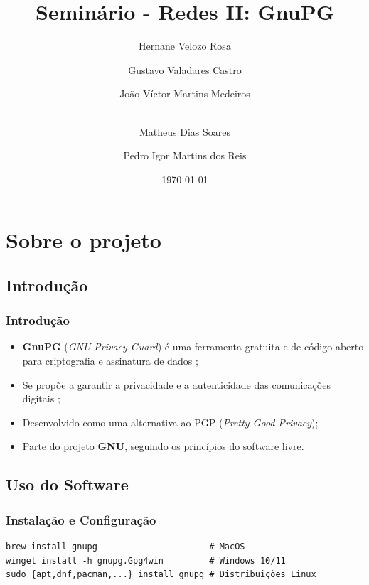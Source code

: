 \documentclass[aspectratio=169]{beamer}
\date{\today}
\title[GNU Privacy Guard]{Seminário - Redes II: GnuPG}
\author[Hernane\and Gustavo\and João\and Matheus\and Pedro]{
    Hernane Velozo Rosa \and
    Gustavo Valadares Castro \and
    João Víctor Martins Medeiros \and\\
    Matheus Dias Soares \and
    Pedro Igor Martins dos Reis
}
\institute[PUC]{Pontifícia Universidade Católica de Minas Gerais}
\begin{document}
\begin{frame}
	\maketitle
\end{frame}
\section{Sobre o projeto}
\subsection{Introdução}
\begin{frame}
	\frametitle{Introdução}
	\begin{itemize}
		\item \textbf{GnuPG} (\textit{GNU Privacy Guard}) é uma ferramenta gratuita e de código aberto para criptografia e assinatura de dados \cite{gnupgPrivacyGuard};
		\item Se propõe a garantir a privacidade e a autenticidade das comunicações digitais \cite{archlinuxGnuPGArchWiki};
		\item Desenvolvido como uma alternativa ao PGP (\textit{Pretty Good Privacy});
		\item Parte do projeto \textbf{GNU}, seguindo os princípios do software livre.
	\end{itemize}
\end{frame}
\subsection{Uso do Software}
\begin{frame}[fragile]
	\frametitle{Instalação e Configuração}
	\begin{lstlisting}[caption=Comandos para instalação]
brew install gnupg                      # MacOS
winget install -h gnupg.Gpg4win         # Windows 10/11
sudo {apt,dnf,pacman,...} install gnupg # Distribuições Linux
        \end{lstlisting}
\end{frame}
\end{document}

